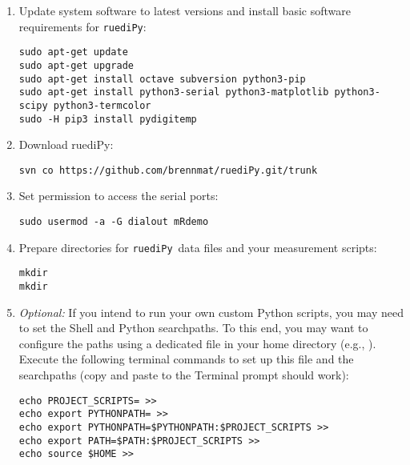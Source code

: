 \documentclass[12pt]{article}   	%
\newcommand{\ruediPy}{\texttt{ruediPy}}
\begin{document}
\begin{enumerate}

\item Update system software to latest versions and install basic software requirements for \ruediPy:\par
\texttt{sudo apt-get update}\\
\texttt{sudo apt-get upgrade}\\
\texttt{sudo apt-get install octave subversion python3-pip}\\
\texttt{sudo apt-get install python3-serial python3-matplotlib python3-scipy python3-termcolor}\\
\texttt{sudo -H pip3 install pydigitemp}\\

\item Download ruediPy:\par
\texttt{svn co https://github.com/brennmat/ruediPy.git/trunk }


\item Set permission to access the serial ports:\par
\texttt{sudo usermod -a -G dialout mRdemo}

\item Prepare directories for \ruediPy\ data files and your measurement scripts:\par
\texttt{mkdir }\\
\texttt{mkdir }

\item \emph{Optional:} If you intend to run your own custom Python scripts, you may need to set the Shell and Python searchpaths. To this end, you may want to configure the paths using a dedicated file in your home directory (e.g., ). Execute the following terminal commands to set up this file and the searchpaths (copy and paste to the Terminal prompt should work):\par
{\scriptsize
\mbox{\texttt{echo PROJECT_SCRIPTS= >> }}\\[-1.5ex]
\mbox{\texttt{echo export PYTHONPATH= >> }}\\[-1.5ex]
\mbox{\texttt{echo export PYTHONPATH=\textsc{}\$PYTHONPATH\textsc{}:\textsc{}\$PROJECT_SCRIPTS\textsc{} >> }}\\[-1.5ex]
\mbox{\texttt{echo export PATH=\textsc{}\$PATH\textsc{}:\textsc{}\$PROJECT_SCRIPTS\textsc{} >> }}\\[-1.5ex]
\mbox{\texttt{echo source \textsc{}\$HOME\textsc{} >> }}
}


\end{enumerate}
\end{document}

